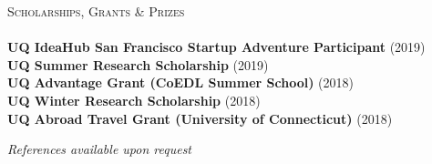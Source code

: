\documentclass[a4paper]{article}
\newcommand{\lineunder} {
    \vspace*{-8pt} \\
    \hspace*{-10pt} \hrulefill \\
}
\newcommand{\header} [1] {
    {\hspace*{-10pt}\vspace*{6pt} \textsc{#1}}
    \vspace*{-6pt} \lineunder
}
\begin{document}
\vspace{1mm}

\header{Scholarships, Grants \& Prizes}
\textbf{UQ IdeaHub San Francisco Startup Adventure Participant} \hfill (2019)\\
\textbf{UQ Summer Research Scholarship} \hfill (2019)\\
\textbf{UQ Advantage Grant (CoEDL Summer School)} \hfill (2018)\\
\textbf{UQ Winter Research Scholarship} \hfill (2018)\\
\textbf{UQ Abroad Travel Grant (University of Connecticut)} \hfill (2018)\\


\vspace{3.5mm}
\begin{center}
\small \textit{References available upon request}
\end{center}
\end{document}
